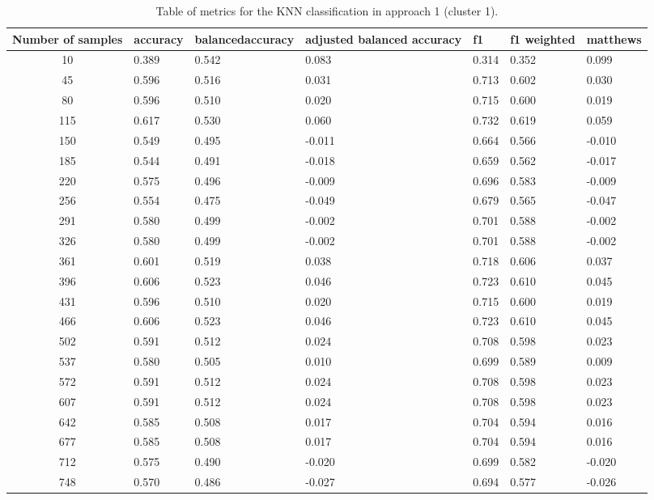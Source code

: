\documentclass[sigplan,screen]{acmart}
\begin{document}
\begin{table}[h]
  \caption{Table of metrics for the KNN classification in approach 1 (cluster 1).}
  \label{tab:A1_classification_knn_cluster1}
  \begin{tabular}{cllllll}
    \toprule
    Number of samples & accuracy & balancedaccuracy & adjusted balanced accuracy & f1 & f1 weighted & matthews\\
    \midrule
        10 & 0.389 & 0.542 & 0.083 & 0.314 & 0.352 & 0.099\\
       45 & 0.596 & 0.516 & 0.031 & 0.713 & 0.602 & 0.030\\
       80 & 0.596 & 0.510 & 0.020 & 0.715 & 0.600 & 0.019\\
      115 & 0.617 & 0.530 & 0.060 & 0.732 & 0.619 & 0.059\\
      150 & 0.549 & 0.495 &-0.011 & 0.664 & 0.566 &-0.010\\
      185 & 0.544 & 0.491 &-0.018 & 0.659 & 0.562 &-0.017\\
      220 & 0.575 & 0.496 &-0.009 & 0.696 & 0.583 &-0.009\\
      256 & 0.554 & 0.475 &-0.049 & 0.679 & 0.565 &-0.047\\
      291 & 0.580 & 0.499 &-0.002 & 0.701 & 0.588 &-0.002\\
      326 & 0.580 & 0.499 &-0.002 & 0.701 & 0.588 &-0.002\\
      361 & 0.601 & 0.519 & 0.038 & 0.718 & 0.606 & 0.037\\
      396 & 0.606 & 0.523 & 0.046 & 0.723 & 0.610 & 0.045\\
      431 & 0.596 & 0.510 & 0.020 & 0.715 & 0.600 & 0.019\\
      466 & 0.606 & 0.523 & 0.046 & 0.723 & 0.610 & 0.045\\
      502 & 0.591 & 0.512 & 0.024 & 0.708 & 0.598 & 0.023\\
      537 & 0.580 & 0.505 & 0.010 & 0.699 & 0.589 & 0.009\\
      572 & 0.591 & 0.512 & 0.024 & 0.708 & 0.598 & 0.023\\
      607 & 0.591 & 0.512 & 0.024 & 0.708 & 0.598 & 0.023\\
      642 & 0.585 & 0.508 & 0.017 & 0.704 & 0.594 & 0.016\\
      677 & 0.585 & 0.508 & 0.017 & 0.704 & 0.594 & 0.016\\
      712 & 0.575 & 0.490 &-0.020 & 0.699 & 0.582 &-0.020\\
      748 & 0.570 & 0.486 &-0.027 & 0.694 & 0.577 &-0.026\\

\end{tabular}
\end{table}
\end{document}
